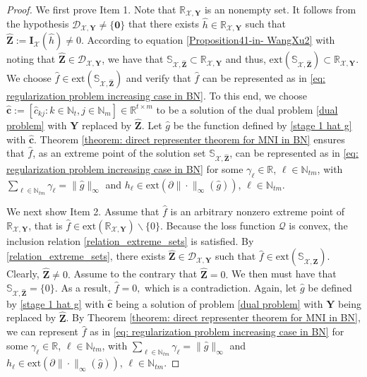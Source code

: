 \documentclass[11pt]{article}
\begin{document}
\begin{proof}
We first prove Item 1. Note that $\mathbb{R}_{\mathcal{X},\mathbf{Y}}$ is an nonempty set. It follows from the hypothesis $\mathcal{D}_{\mathcal{X},\mathbf{Y}}\neq\{\mathbf{0}\}$ that there exists $\hat{h}\in\mathbb{R}_{\mathcal{X},\mathbf{Y}}$ such that $\hat{\mathbf{Z}}:=\mathbf{I}_{\mathcal{X}}(\hat{h})\neq 0$. According to equation \eqref{Proposition41-in- WangXu2} with noting that $\hat{\mathbf{Z}}\in\mathcal{D}_{\mathcal{X},\mathbf{Y}}$, we have that $\mathbb{S}_{\mathcal{X},\hat{\mathbf{Z}}}\subset\mathbb{R}_{\mathcal{X},\mathbf{Y}}$ and thus, $\mathrm{ext}\left(\mathbb{S}_{\mathcal{X},\hat{\mathbf{Z}}}\right)\subset\mathbb{R}_{\mathcal{X},\mathbf{Y}}$. We choose $\hat f\in\mathrm{ext}\left(\mathbb{S}_{\mathcal{X},\hat{\mathbf{Z}}}\right)$ and verify that $\hat f$ can be represented as in  \eqref{eq: regularization problem increasing case in BN}. To this end, we choose $\hat{\mathbf{c}}:=[\hat{c}_{kj}:k\in\mathbb{N}_t,j\in\mathbb{N}_m]\in\mathbb{R}^{t\times m}$ to be a solution of the dual problem \eqref{dual problem} with $\mathbf{Y}$ replaced by $\hat{\mathbf{Z}}$. Let $\hat g$ be the function defined by \eqref{stage 1 hat g} with $\hat{\mathbf{c}}$. Theorem \ref{theorem: direct representer theorem for MNI in BN} ensures that $\hat f$, as an extreme point of the solution set $\mathbb{S}_{\mathcal{X},\hat{\mathbf{Z}}}$, can be represented as in  \eqref{eq: regularization problem increasing case in BN} for some $\gamma_\ell\in\mathbb{R}$, $\ell\in\mathbb{N}_{tm}$, with  $\sum_{\ell\in\mathbb{N}_{tm}}\gamma_\ell=\|\hat g\|_{\infty}$ and $h_\ell\in\mathrm{ext}(\partial\|\cdot\|_\infty(\hat g))$, $\ell\in\mathbb{N}_{tm}$.

We next show Item 2. Assume that $\hat f$ is an arbitrary nonzero extreme point of $\mathbb{R}_{\mathcal{X},\mathbf{Y}}$, that is $\hat f\in\mathrm{ext}(\mathbb{R}_{\mathcal{X},\mathbf{Y}})\backslash\{0\}$. Because the loss function $\mathcal{Q}$ is convex,  the inclusion relation  \eqref{relation_extreme_sets} is satisfied. By \eqref{relation_extreme_sets}, there exists $\hat{\mathbf{Z}}\in\mathcal{D}_{\mathcal{X},\mathbf{Y}}$ such that $\hat f\in\mathrm{ext}\left(\mathbb{S}_{\mathcal{X},\hat{\mathbf{Z}}}\right)$. Clearly, $\hat{\mathbf{Z}}\neq 0.$ Assume to the contrary that $\hat{\mathbf{Z}}= 0.$ We then must have that $\mathbb{S}_{\mathcal{X},\hat{\mathbf{Z}}}=\{0\}.$ As a result, $\hat f=0,$ which is a contradiction.
Again, let $\hat g$ be defined by \eqref{stage 1 hat g} with $\hat{\mathbf{c}}$ being a solution of problem \eqref{dual problem} with $\mathbf{Y}$ being replaced by $\hat{\mathbf{Z}}$. By Theorem \ref{theorem: direct representer theorem for MNI in BN}, we can represent $\hat f$ as in  \eqref{eq: regularization problem increasing case in BN} for some $\gamma_\ell\in\mathbb{R}$, $\ell\in\mathbb{N}_{tm}$, with  $\sum_{\ell\in\mathbb{N}_{tm}}\gamma_\ell=\|\hat g\|_{\infty}$ and $h_\ell\in\mathrm{ext}(\partial\|\cdot\|_\infty(\hat g))$, $\ell\in\mathbb{N}_{tm}$.
\end{proof}
\end{document}
